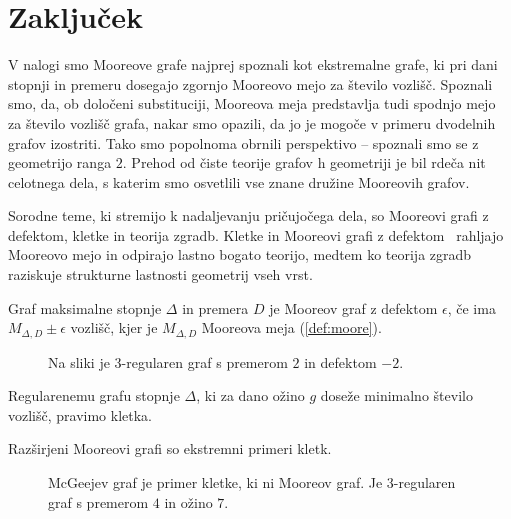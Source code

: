 \documentclass[fin1, tisk]{fmfdelo}
\begin{document}
\section{Zaključek}
V nalogi smo Mooreove grafe najprej spoznali kot ekstremalne grafe, ki pri dani stopnji in premeru dosegajo zgornjo 
Mooreovo mejo za število vozlišč. Spoznali smo, da, ob določeni substituciji, Mooreova meja predstavlja tudi spodnjo mejo za število vozlišč grafa,
nakar smo opazili, da jo je mogoče v primeru dvodelnih grafov izostriti. Tako smo popolnoma obrnili perspektivo -- spoznali smo se z geometrijo ranga $2$.
Prehod od čiste teorije grafov h geometriji je bil rdeča nit celotnega dela, s katerim smo osvetlili vse znane družine Mooreovih grafov.

Sorodne teme, ki stremijo k nadaljevanju pričujočega dela, so Mooreovi grafi z defektom, kletke in teorija zgradb.
Kletke in Mooreovi grafi z defektom~\cite{FERIAPURON20111331} rahljajo Mooreovo 
mejo in odpirajo lastno bogato teorijo, medtem ko teorija zgradb~\cite{everitt2013veryshortintroductionbuildings} raziskuje strukturne lastnosti geometrij vseh vrst.

\begin{definicija}
    Graf maksimalne stopnje $\Delta$ in premera $D$ je Mooreov graf z defektom $\epsilon$,
    če ima $M_{\Delta, D} \pm \epsilon$ vozlišč, 
    kjer je $M_{\Delta, D}$ Mooreova meja (\ref{def:moore}).
\end{definicija}

\begin{figure}[htbp]
    \centering
    \caption{Na sliki je $3$-regularen graf s premerom $2$ in defektom $-2$.}
\end{figure}

\begin{definicija}
    Regularenemu grafu stopnje $\Delta$, ki za dano ožino $g$ doseže minimalno 
    število vozlišč, pravimo kletka.
\end{definicija}

\begin{opomba}
    Razširjeni Mooreovi grafi so ekstremni primeri kletk.
\end{opomba}

\begin{figure}[htbp]
    \centering
    \caption{McGeejev graf je primer kletke, ki ni Mooreov graf. Je $3$-regularen graf s premerom $4$ in ožino $7$.}
\end{figure}
\end{document}
